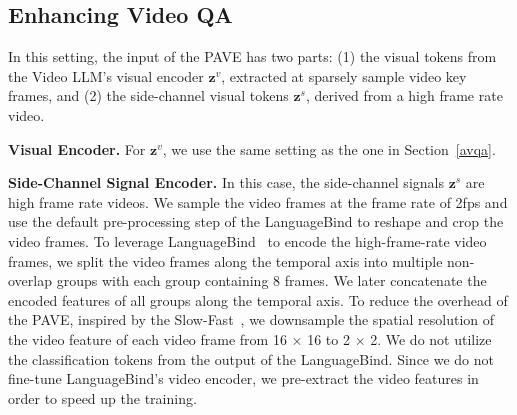 





\subsection{Enhancing Video QA} \label{enhanced_video_qa}
In this setting, the input of the PAVE has two parts: (1) the visual tokens from the Video LLM's visual encoder $\mathbf{z}^v$, extracted at sparsely sample video key frames, and (2) the side-channel visual tokens $\mathbf{z}^s$, derived from a high frame rate video.

\medskip
\noindent \textbf{Visual Encoder.} For $\mathbf{z}^v$, we use the same setting as the one in Section~\ref{avqa}.  

\medskip
\noindent \textbf{Side-Channel Signal Encoder.} In this case, the side-channel signals $\mathbf{z}^s$ are high frame rate videos. We sample the video frames at the frame rate of 2fps and use the default pre-processing step of the LanguageBind to reshape and crop the video frames. To leverage LanguageBind~\cite{zhu2023languagebind} to encode the high-frame-rate video frames, we split the video frames along the temporal axis into multiple non-overlap groups with each group containing 8 frames. We later concatenate the encoded features of all groups along the temporal axis. To reduce the overhead of the PAVE, inspired by the Slow-Fast~\cite{feichtenhofer2019slowfastnetworksvideorecognition}, we downsample the spatial resolution of the video feature of each video frame from 16 $\times$ 16 to 2 $\times$ 2. We do not utilize the classification tokens from the output of the LanguageBind. Since we do not fine-tune LanguageBind's video encoder, we pre-extract the video features in order to speed up the training.

